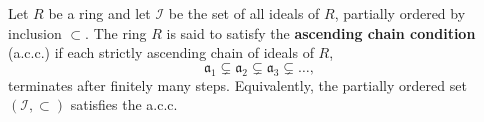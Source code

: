 Let $R$ be a ring and let $\mathcal{I}$ be the set of all ideals of $R$, partially ordered by inclusion $\subset$. The ring $R$ is said to satisfy the \textbf{ascending chain condition} (a.c.c.) if each strictly ascending chain of ideals of $R$,
$$\mathfrak{a}_1 \subsetneq \mathfrak{a}_2 \subsetneq \mathfrak{a}_3 \subsetneq \ldots,$$
terminates after finitely many steps. Equivalently, the partially ordered set $(\mathcal{I}, \subset)$ satisfies the a.c.c.
